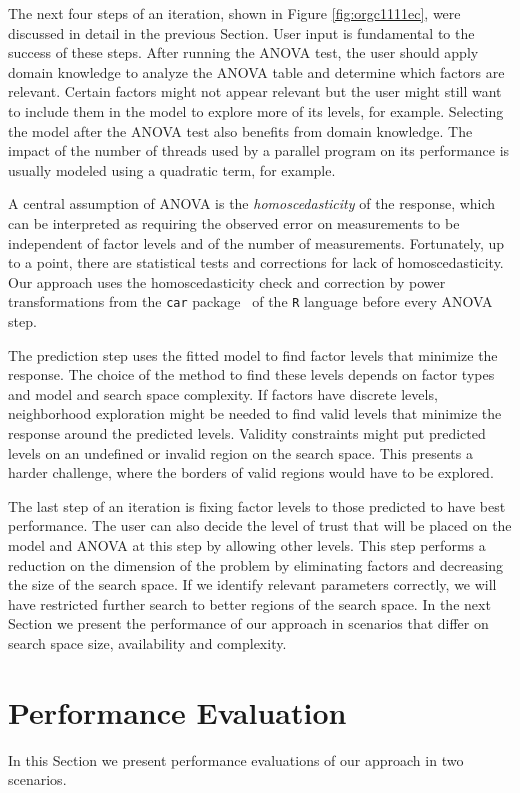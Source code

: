 \documentclass[conference]{IEEEtran}
\begin{document}
The next four steps of an iteration, shown in Figure \ref{fig:orgc1111ec},
were discussed in detail in the previous Section. User input is fundamental to
the success of these steps. After running the ANOVA test, the user should apply
domain knowledge to analyze the ANOVA table and determine which factors are
relevant. Certain factors might not appear relevant but the user might still
want to include them in the model to explore more of its levels, for example.
Selecting the model after the ANOVA test also benefits from domain knowledge.
The impact of the number of threads used by a parallel program on its
performance is usually modeled using a quadratic term, for example.

A central assumption of ANOVA is the \emph{homoscedasticity} of the response, which
can be interpreted as requiring the observed error on measurements to be
independent of factor levels and of the number of measurements. Fortunately, up
to a point, there are statistical tests and corrections for lack of
homoscedasticity. Our approach uses the homoscedasticity check and correction by
power transformations from the \texttt{car} package~\cite{fox2011car} of the \texttt{R}
language before every ANOVA step.

The prediction step uses the fitted model to find factor levels that minimize
the response. The choice of the method to find these levels depends on factor
types and model and search space complexity. If factors have discrete levels,
neighborhood exploration might be needed to find valid levels that minimize the
response around the predicted levels. Validity constraints might put predicted
levels on an undefined or invalid region on the search space. This presents a
harder challenge, where the borders of valid regions would have to be explored.

The last step of an iteration is fixing factor levels to those predicted to have
best performance. The user can also decide the level of trust that will be
placed on the model and ANOVA at this step by allowing other levels. This step
performs a reduction on the dimension of the problem by eliminating factors and
decreasing the size of the search space. If we identify relevant parameters
correctly, we will have restricted further search to better regions of the
search space. In the next Section we present the performance of our approach in
scenarios that differ on search space size, availability and complexity.
\section{Performance Evaluation}
\label{sec:orge528b74}
In this Section we present performance evaluations of our approach in two
scenarios.
\end{document}
